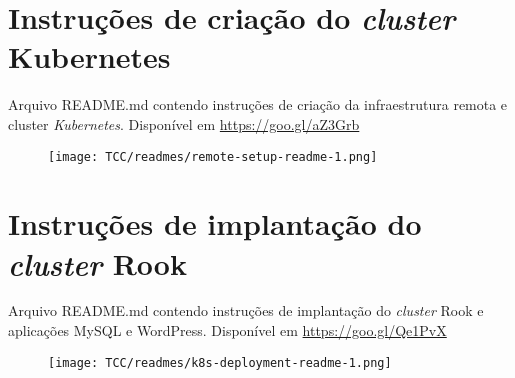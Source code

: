 \begin{anexosenv}
\partanexos
    
    
\chapter{Instruções de criação do \textit{cluster} Kubernetes}

Arquivo README.md contendo instruções de criação da infraestrutura remota e cluster \textit{Kubernetes}. Disponível em \href{https://goo.gl/aZ3Grb}{https://goo.gl/aZ3Grb}

\begin{figure}[!htpb]
	\centering
    \texttt{[image: TCC/readmes/remote-setup-readme-1.png]}
\end{figure}


\chapter{Instruções de implantação do \textit{cluster} Rook}

Arquivo README.md contendo instruções de implantação do \textit{cluster} Rook e aplicações MySQL e WordPress. Disponível em \href{https://goo.gl/Qe1PvX}{https://goo.gl/Qe1PvX}

\begin{figure}[!htpb]
	\centering
    \texttt{[image: TCC/readmes/k8s-deployment-readme-1.png]}
\end{figure}



\end{anexosenv}